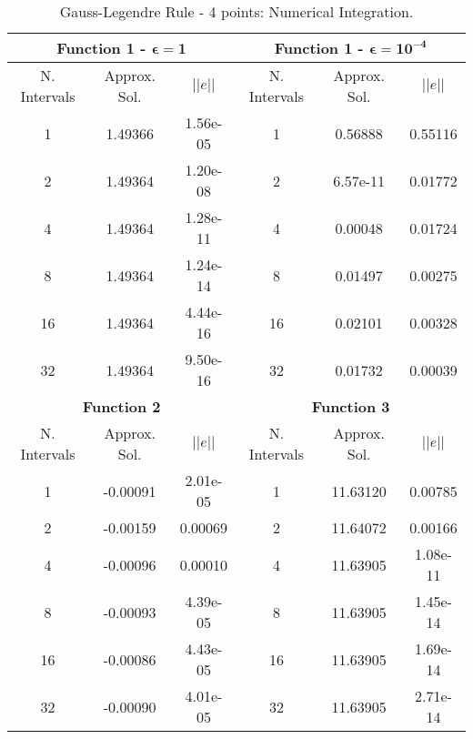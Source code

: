 \begin{table}[H]
    \centering
    \caption{Gauss-Legendre Rule - 4 points: Numerical Integration.}
    \label{tab:gauss4_int}
    \begin{tabular}{ccc|ccc}
    \hline
    \multicolumn{3}{c}{\textbf{Function 1  -} $\bm{\epsilon = 1}$} & \multicolumn{3}{c}{\textbf{Function 1 -} $\bm{\epsilon = 10^{-4}}$} \\ \hline
    N. Intervals & Approx. Sol. & $|| e ||$ & N. Intervals & Approx. Sol. & $|| e ||$ \\ \hline
    1 & 1.49366 & 1.56e-05 & 1 & 0.56888 & 0.55116 \\
    2 & 1.49364 & 1.20e-08 & 2 & 6.57e-11 & 0.01772 \\
    4 & 1.49364 & 1.28e-11 & 4 & 0.00048 & 0.01724 \\
    8 & 1.49364 & 1.24e-14 & 8 & 0.01497 & 0.00275 \\
    16 & 1.49364 & 4.44e-16 & 16 & 0.02101 & 0.00328 \\
    32 & 1.49364 & 9.50e-16 & 32 & 0.01732 & 0.00039 \\ \hline
    \multicolumn{3}{c}{\textbf{Function 2}} & \multicolumn{3}{c}{\bf{Function 3}} \\ \hline
    N. Intervals & Approx. Sol. & $|| e ||$ & N. Intervals & Approx. Sol. & $|| e ||$ \\ \hline
    1 & -0.00091 & 2.01e-05 & 1 & 11.63120 & 0.00785 \\ 
    2 & -0.00159 & 0.00069 & 2 & 11.64072 & 0.00166  \\
    4 & -0.00096 & 0.00010 & 4 & 11.63905 & 1.08e-11 \\
    8 & -0.00093 & 4.39e-05 & 8 & 11.63905 &  1.45e-14 \\
    16 & -0.00086 & 4.43e-05 & 16 & 11.63905 & 1.69e-14 \\
    32 & -0.00090 & 4.01e-05 & 32 & 11.63905 & 2.71e-14 \\ \hline
    \end{tabular}
\end{table}
